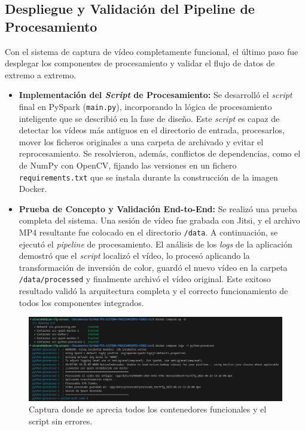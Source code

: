 \subsection{Despliegue y Validación del Pipeline de Procesamiento}
Con el sistema de captura de vídeo completamente funcional, el último paso fue desplegar los componentes de procesamiento y validar el flujo de datos de extremo a extremo.
\begin{itemize}
    \item \textbf{Implementación del \textit{Script} de Procesamiento:} Se desarrolló el \textit{script} final en PySpark (\texttt{main.py}), incorporando la lógica de procesamiento inteligente que se describió en la fase de diseño. Este \textit{script} es capaz de detectar los vídeos más antiguos en el directorio de entrada, procesarlos, mover los ficheros originales a una carpeta de archivado y evitar el reprocesamiento. Se resolvieron, además, conflictos de dependencias, como el de NumPy con OpenCV, fijando las versiones en un fichero \texttt{requirements.txt} que se instala durante la construcción de la imagen Docker.
    
    \item \textbf{Prueba de Concepto y Validación End-to-End:} Se realizó una prueba completa del sistema. Una sesión de vídeo fue grabada con Jitsi, y el archivo MP4 resultante fue colocado en el directorio \texttt{/data}. A continuación, se ejecutó el \textit{pipeline} de procesamiento. El análisis de los \textit{logs} de la aplicación demostró que el \textit{script} localizó el vídeo, lo procesó aplicando la transformación de inversión de color, guardó el nuevo vídeo en la carpeta \texttt{/data/processed} y finalmente archivó el vídeo original. Este exitoso resultado validó la arquitectura completa y el correcto funcionamiento de todos los componentes integrados.
\end{itemize}

\begin{figure}[H]
    \centering
    \includegraphics[width=\textwidth]{img/logsfinalpy.png}
    \caption{Captura donde se aprecia todos los contenedores funcionales y el script sin errores.}
    \label{fig:Logs Conexion completa sin errores}
\end{figure}

